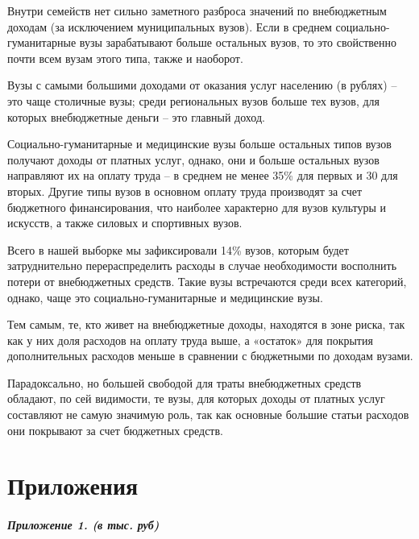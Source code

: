 \documentclass[]{book}
\let\oldparagraph\paragraph
\renewcommand{\paragraph}[1]{\oldparagraph{#1}\mbox{}}
\begin{document}
Внутри семейств нет сильно заметного разброса значений по внебюджетным доходам (за исключением муниципальных вузов). Если в среднем социально-гуманитарные вузы зарабатывают больше остальных вузов, то это свойственно почти всем вузам этого типа, также и наоборот.

Вузы с самыми большими доходами от оказания услуг населению (в рублях) -- это чаще столичные вузы; среди региональных вузов больше тех вузов, для которых внебюджетные деньги -- это главный доход.

Социально-гуманитарные и медицинские вузы больше остальных типов вузов получают доходы от платных услуг, однако, они и больше остальных вузов направляют их на оплату труда -- в среднем не менее 35\% для первых и 30 для вторых. Другие типы вузов в основном оплату труда производят за счет бюджетного финансирования, что наиболее характерно для вузов культуры и искусств, а также силовых и спортивных вузов.

Всего в нашей выборке мы зафиксировали 14\% вузов, которым будет затруднительно перераспределить расходы в случае необходимости восполнить потери от внебюджетных средств. Такие вузы встречаются среди всех категорий, однако, чаще это социально-гуманитарные и медицинские вузы.

Тем самым, те, кто живет на внебюджетные доходы, находятся в зоне риска, так как у них доля расходов на оплату труда выше, а «остаток» для покрытия дополнительных расходов меньше в сравнении с бюджетными по доходам вузами.

Парадоксально, но большей свободой для траты внебюджетных средств обладают, по сей видимости, те вузы, для которых доходы от платных услуг составляют не самую значимую роль, так как основные большие статьи расходов они покрывают за счет бюджетных средств.

\hypertarget{ux43fux440ux438ux43bux43eux436ux435ux43dux438ux44f}{%
\chapter{Приложения}\label{ux43fux440ux438ux43bux43eux436ux435ux43dux438ux44f}}

\hypertarget{ux43fux440ux438ux43bux43eux436ux435ux43dux438ux435-1.-ux432-ux442ux44bux441.-ux440ux443ux431}{%
\paragraph{\texorpdfstring{Приложение 1. { (в тыс. руб) }}{Приложение 1.  (в тыс. руб) }}\label{ux43fux440ux438ux43bux43eux436ux435ux43dux438ux435-1.-ux432-ux442ux44bux441.-ux440ux443ux431}}
\end{document}

